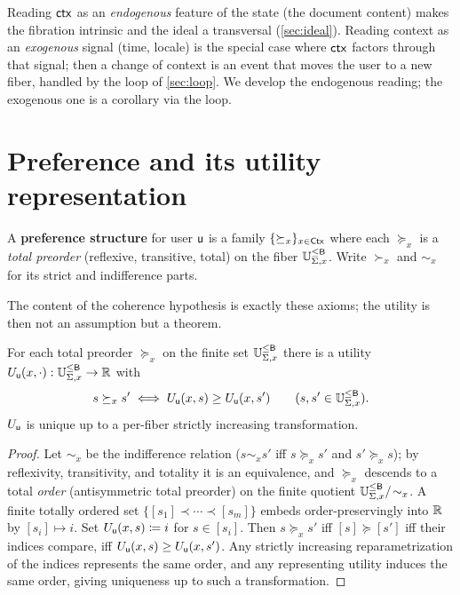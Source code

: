 \documentclass[../uxoxo-main]{subfiles}
\begin{document}
\begin{remark}\label{rem:ctx}
Reading $\mathsf{ctx}$ as an \emph{endogenous} feature of the state (the document
content) makes the fibration intrinsic and the ideal a transversal
(\cref{sec:ideal}). Reading context as an \emph{exogenous} signal (time, locale)
is the special case where $\mathsf{ctx}$ factors through that signal; then a change of
context is an event that moves the user to a new fiber, handled by the loop of
\cref{sec:loop}. We develop the endogenous reading; the exogenous one is a
corollary via the loop.
\end{remark}

\section{Preference and its utility representation}\label{sec:pref}
\begin{definition}\label{def:pref}
A \textbf{preference structure} for user $\mathsf{u}$ is a family
$\{\succeq_x\}_{x\in\mathsf{Ctx}}$ where each $\succeq_x$ is a \emph{total preorder}
(reflexive, transitive, total) on the fiber $\mathbb{U}_{\Sigma,x}^{\le \mathsf{B}}$. Write $\succ_x$ and
$\sim_x$ for its strict and indifference parts.
\end{definition}

The content of the coherence hypothesis is exactly these axioms; the utility is
then not an assumption but a theorem.

\begin{theorem}\label{thm:rep}
For each total preorder $\succeq_x$ on the finite set $\mathbb{U}_{\Sigma,x}^{\le \mathsf{B}}$ there is a utility
$U_{\mathsf{u}}(x,\cdot):\mathbb{U}_{\Sigma,x}^{\le \mathsf{B}}\to\mathbb{R}$ with
\[
  s\succeq_x s'\iff U_{\mathsf{u}}(x,s)\ge U_{\mathsf{u}}(x,s')\qquad(s,s'\in\mathbb{U}_{\Sigma,x}^{\le \mathsf{B}}).
\]
$U_{\mathsf{u}}$ is unique up to a per-fiber strictly increasing transformation.
\end{theorem}

\begin{proof}
Let $\sim_x$ be the indifference relation ($s\sim_x s'$ iff $s\succeq_x s'$ and
$s'\succeq_x s$); by reflexivity, transitivity, and totality it is an
equivalence, and $\succeq_x$ descends to a total \emph{order} (antisymmetric
total preorder) on the finite quotient $\mathbb{U}_{\Sigma,x}^{\le \mathsf{B}}/\!\sim_x$. A finite totally
ordered set $\{[s_1]\prec\cdots\prec[s_m]\}$ embeds order-preservingly into
$\mathbb{R}$ by $[s_i]\mapsto i$. Set $U_{\mathsf{u}}(x,s)\coloneqq i$ for $s\in[s_i]$. Then
$s\succeq_x s'$ iff $[s]\succeq[s']$ iff their indices compare, iff
$U_{\mathsf{u}}(x,s)\ge U_{\mathsf{u}}(x,s')$. Any strictly increasing reparametrization of the
indices represents the same order, and any representing utility induces the same
order, giving uniqueness up to such a transformation.
\end{proof}
\end{document}
